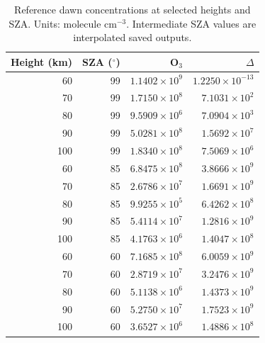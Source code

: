 \begin{table}[htbp]\centering{}\footnotesize\caption{Reference dawn concentrations at selected heights and SZA. Units: molecule cm$^{-3}$. Intermediate SZA values are interpolated saved outputs.}\label{tab:reference}\begin{tabular}{rrrr}\toprule Height (km) & SZA ($^\circ$) & O$_3$ & $\Delta$\\\midrule
60 & 99 & $1.1402\times10^{9}$ & $1.2250\times10^{-13}$\\
70 & 99 & $1.7150\times10^{8}$ & $7.1031\times10^{2}$\\
80 & 99 & $9.5909\times10^{6}$ & $7.0904\times10^{3}$\\
90 & 99 & $5.0281\times10^{8}$ & $1.5692\times10^{7}$\\
100 & 99 & $1.8340\times10^{8}$ & $7.5069\times10^{6}$\\
60 & 85 & $6.8475\times10^{8}$ & $3.8666\times10^{9}$\\
70 & 85 & $2.6786\times10^{7}$ & $1.6691\times10^{9}$\\
80 & 85 & $9.9255\times10^{5}$ & $6.4262\times10^{8}$\\
90 & 85 & $5.4114\times10^{7}$ & $1.2816\times10^{9}$\\
100 & 85 & $4.1763\times10^{6}$ & $1.4047\times10^{8}$\\
60 & 60 & $7.1685\times10^{8}$ & $6.0059\times10^{9}$\\
70 & 60 & $2.8719\times10^{7}$ & $3.2476\times10^{9}$\\
80 & 60 & $5.1138\times10^{6}$ & $1.4373\times10^{9}$\\
90 & 60 & $5.2750\times10^{7}$ & $1.7523\times10^{9}$\\
100 & 60 & $3.6527\times10^{6}$ & $1.4886\times10^{8}$\\\bottomrule\end{tabular}\end{table}
